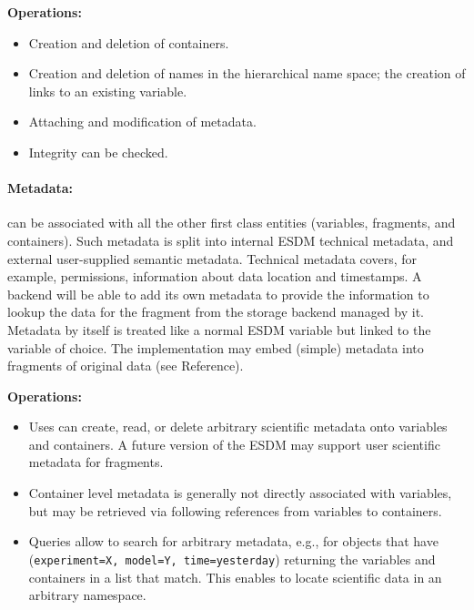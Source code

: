 \textbf{Operations:}
\begin{itemize}
	\item Creation and deletion of containers.
	\item Creation and deletion of names in the hierarchical name space; the creation of links to an existing variable.
	\item Attaching and modification of metadata.
	\item Integrity can be checked.
\end{itemize}

\paragraph{Metadata:} can be associated with all the other first class entities (variables, fragments, and containers). Such metadata is split into internal ESDM technical metadata, and external user-supplied semantic metadata.
Technical metadata covers, for example, permissions, information about data location and timestamps.
A backend will be able to add its own metadata to provide the information to lookup the data for the fragment from the storage backend managed by it.
Metadata by itself is treated like a normal ESDM variable but linked to the variable of choice.
The implementation may embed (simple) metadata into fragments of original data (see Reference).

\textbf{Operations:}
\begin{itemize}
	\item Uses can create, read, or delete arbitrary scientific metadata onto variables and containers.
	A future version of the ESDM may support user scientific metadata for fragments.
	\item Container level metadata is generally not directly associated with variables, but may be retrieved via following
	references from variables to containers.
	\item Queries allow to search for arbitrary metadata, e.g., for objects that have (\texttt{experiment=X, model=Y, time=yesterday})  returning the variables and containers in a list that match.
	This enables to locate scientific data in an arbitrary namespace.
\end{itemize}

